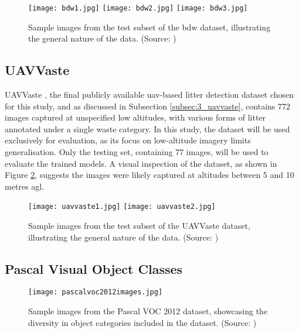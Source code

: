 \begin{figure}[!htbp]
  \centering
  \texttt{[image: bdw1.jpg]}
  \hfill
  \texttt{[image: bdw2.jpg]}
  \hfill
  \texttt{[image: bdw3.jpg]}
  \caption{Sample images from the test subset of the \gls{bdw} dataset, illustrating the general nature of the data. (Source: \cite{bdwdataset})}
  \label{fig:bdw_samples}
\end{figure}


\subsection{UAVVaste}
\label{subsec:4_uavvaste}

UAVVaste \cite{uavvaste}, the final publicly available \gls{uav}-based litter detection dataset chosen for this study, and as discussed in Subsection \ref{subsec:3_uavvaste}, contains 772 images captured at unspecified low altitudes, with various forms of litter annotated under a single waste category. In this study, the dataset will be used exclusively for evaluation, as its focus on low-altitude imagery limits generalisation. Only the testing set, containing 77 images, will be used to evaluate the trained models. A visual inspection of the dataset, as shown in Figure \ref{fig:uavvaste_samples}, suggests the images were likely captured at altitudes between 5 and 10 metres \gls{agl}.

\begin{figure}[!htbp]
  \centering
  \texttt{[image: uavvaste1.jpg]}
  \hfill
  \texttt{[image: uavvaste2.jpg]}
  \caption{Sample images from the test subset of the UAVVaste dataset, illustrating the general nature of the data. (Source: \cite{uavvaste})}
  \label{fig:uavvaste_samples}
\end{figure}


\subsection{Pascal Visual Object Classes}
\label{subsec:4_pascal_voc}

\begin{figure}[!b]%
    \centering
    \texttt{[image: pascalvoc2012images.jpg]}
    \caption{Sample images from the Pascal VOC 2012 dataset, showcasing the diversity in object categories included in the dataset. (Source: \cite{pascal-voc-2012})}
    \label{fig:pascal_voc}%
\end{figure}

